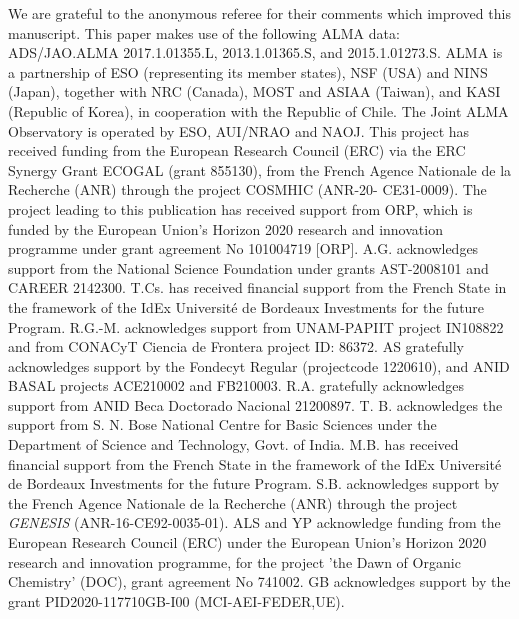 \documentclass[longauth]{aa} %
\begin{document}


\begin{acknowledgement}
We are grateful to the anonymous referee for their comments which improved this manuscript. This paper makes use of the following ALMA data: ADS/JAO.ALMA 2017.1.01355.L, 2013.1.01365.S, and 2015.1.01273.S. ALMA is a partnership of ESO (representing its member states), NSF (USA) and NINS (Japan), together with NRC (Canada), MOST and ASIAA (Taiwan), and KASI (Republic of Korea), in cooperation with the Republic of Chile. The Joint ALMA Observatory is operated by ESO, AUI/NRAO and NAOJ. 
This project has received funding from the European Research Council (ERC) via the ERC Synergy Grant ECOGAL (grant 855130), from the French Agence Nationale de la Recherche (ANR) through the project COSMHIC (ANR-20- CE31-0009).
The project leading to this publication has received support from ORP, which is funded by the European Union’s Horizon 2020 research and innovation programme under grant agreement No 101004719 [ORP].
A.G. acknowledges support from the National Science Foundation under grants AST-2008101 and CAREER 2142300.
T.Cs. has received financial support from the French State in the framework of the IdEx Universit\'e de Bordeaux Investments for the future Program. 
R.G.-M. acknowledges support from UNAM-PAPIIT project IN108822 and from CONACyT Ciencia de Frontera project ID: 86372.
AS gratefully acknowledges support by the Fondecyt Regular (projectcode 1220610), and ANID BASAL projects ACE210002 and FB210003.
R.A. gratefully acknowledges support from ANID Beca Doctorado Nacional 21200897.
T. B.  acknowledges the support from S. N. Bose National Centre for Basic Sciences under the Department of Science and Technology, Govt. of India. 
M.B. has received financial support from the French State in the framework of the IdEx Universit\'e de Bordeaux Investments for the future Program. 
S.B. acknowledges support by the French Agence Nationale de la Recherche (ANR) through the project \textit{GENESIS} (ANR-16-CE92-0035-01).
ALS and YP acknowledge funding from the European Research Council (ERC) under the European Union’s Horizon 2020 research and innovation programme, for the project 'the Dawn of Organic Chemistry' (DOC), grant agreement No 741002.
GB acknowledges support by the grant PID2020-117710GB-I00 (MCI-AEI-FEDER,UE).
\end{acknowledgement}
\end{document}
